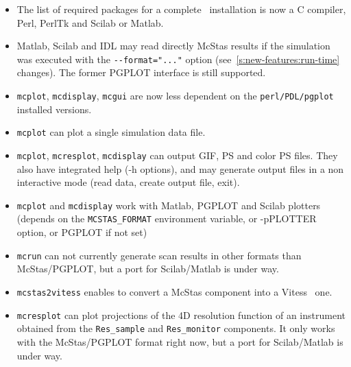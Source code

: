 \begin{itemize}
\item The list of required packages for a complete \MCS\ installation is now a C
    compiler, Perl, PerlTk and Scilab or Matlab.
\item Matlab, Scilab and IDL may read directly McStas results if the simulation
    was executed with the \verb+--format="..."+ option 
    (see~\ref{s:new-features:run-time} changes). The former PGPLOT interface is still
    supported. 
      
     
\item \verb+mcplot+, \verb+mcdisplay+, \verb+mcgui+ are now less dependent on the
    \verb+perl/PDL/pgplot+ installed versions. 
\item \verb+mcplot+ can plot a single simulation data file.
\item \verb+mcplot+, \verb+mcresplot+, \verb+mcdisplay+ can output GIF, PS and color
    PS files. They also have integrated help (-h options), and may generate output
    files in a non interactive mode (read data, create output file, exit).
\item \verb+mcplot+ and \verb+mcdisplay+ work with Matlab, PGPLOT and Scilab plotters
   (depends on the \verb+MCSTAS_FORMAT+ environment variable, or -pPLOTTER option, or
   PGPLOT if not set)
\item \verb+mcrun+ can not currently generate scan results in other formats than
   McStas/PGPLOT, but a port for Scilab/Matlab is under way. 
\item \verb+mcstas2vitess+ enables to convert a McStas component into a
   Vitess~\cite{vitess_webpage} one. 
\item \verb+mcresplot+ can plot projections of the 4D resolution function of an 
   instrument obtained from the \verb+Res_sample+ and \verb+Res_monitor+ components.
   It only works with the McStas/PGPLOT format right now, but a port for Scilab/Matlab
   is under way. 
\end{itemize}
